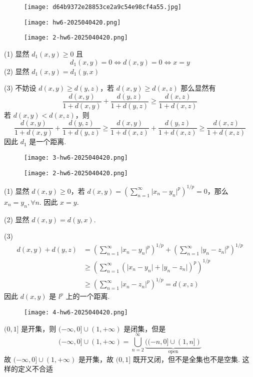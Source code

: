 \begin{figure}[H]
\centering
\texttt{[image: d64b9372e28853ce2a9c54e98cf4a55.jpg]}
\label{}
\end{figure}

\begin{exercise}
\begin{figure}[H]
\centering
\texttt{[image: hw6-2025040420.png]}
\label{}
\end{figure}
\end{exercise}
\begin{figure}[H]
\centering
\texttt{[image: 2-hw6-2025040420.png]}
\label{}
\end{figure}

(1) 显然 $d_1(x,y)\geq0$ 且
\[
d_1(x,y)=0\iff d(x,y)=0\iff x=y
\]
(2) 显然 $d_1(x,y)=d_1(y,x)$

(3) 不妨设 $d(x,y)\geq d(y,z)$，若 $d(x,y)\geq d(x,z)$ 那么显然有
\[
\frac{d(x,y)}{1+d(x,y)}+\frac{d(y,z)}{1+d(y,z)}\geq \frac{d(x,z)}{1+d(x,z)}
\]
若 $d(x,y)<d(x,z)$，则
\[
\frac{d(x,y)}{1+d(x,y)}+\frac{d(y,z)}{1+d(y,z)}\geq \frac{d(x,y)}{1+d(x,z)}+\frac{d(y,z)}{1+d(x,z)}\geq \frac{d(x,z)}{1+d(x,z)}
\]
因此 $d_1$ 是一个距离.

\begin{exercise}
\begin{figure}[H]
\centering
\texttt{[image: 3-hw6-2025040420.png]}
\label{}
\end{figure}
\end{exercise}
\begin{figure}[H]
\centering
\texttt{[image: 2-hw6-2025040420.png]}
\label{}
\end{figure}
(1) 显然 $d(x,y)\geq0$，若 $d(x,y)=\left( \sum_{n=1}^{\infty}\lvert x_n-y_n \rvert ^{p} \right)^{1/p}=0$，那么 $x_n=y_n,\forall n$. 因此 $x=y$.

(2) 显然 $d(x,y)=d(y,x)$.

(3)
\[
\begin{aligned}
d(x,y)+d(y,z) & =\left( \sum_{n=1}^{\infty} \lvert x_n-y_n \rvert ^{p} \right)^{1/p }+\left( \sum_{n=1}^{\infty} \lvert y_n-z_n \rvert ^{p} \right)^{1/p } \\
 & \geq \left( \sum_{n=1}^{\infty} (\lvert x_n-y_n \rvert +\lvert y_n-z_n \rvert )^{p} \right)^{1/p } \\
 & \geq \left( \sum_{n=1}^{\infty} \lvert x_n-z_n \rvert ^{p}  \right)^{1/p }=d(x,z) 
\end{aligned}
\]
因此 $d(x,y)$ 是 $l^{p}$ 上的一个距离.

\begin{exercise}
\begin{figure}[H]
\centering
\texttt{[image: 4-hw6-2025040420.png]}
\label{}
\end{figure}
\end{exercise}
$(0,1]$ 是开集，则 $(-\infty,0]\cup(1,+\infty)$ 是闭集，但是
\[
(-\infty,0]\cup(1,+\infty)=\bigcup_{n=2}^{\infty}\underbrace{ ((-n,0] \cup(1,n]) }_{ \text{open} }
\]
故 $(-\infty,0]\cup(1,+\infty)$ 是开集，故 $(0,1]$ 既开又闭，但不是全集也不是空集. 这样的定义不合适
